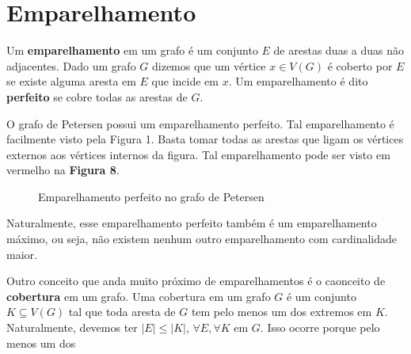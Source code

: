 \documentclass[11pt,a4paper]{exam}
\begin{document}
\section{Emparelhamento}
Um \textbf{emparelhamento} em um grafo é um conjunto $E$ de arestas duas a
duas não adjacentes. Dado um grafo $G$ dizemos que um vértice $x\in
V(G)$ é coberto por $E$ se existe alguma aresta em $E$ que incide em
$x$. Um emparelhamento é dito \textbf{perfeito} se cobre todas as
arestas de $G$. \par
O grafo de Petersen possui um emparelhamento perfeito. Tal
emparelhamento é facilmente visto pela Figura 1. Basta tomar todas as
arestas que ligam os vértices externos aos vértices internos da figura.
Tal emparelhamento pode ser visto em vermelho na \textbf{Figura 8}.
\begin{figure}[H]
    \centering
    \caption{Emparelhamento perfeito no grafo de Petersen}
\end{figure}
Naturalmente, esse emparelhamento perfeito também é um emparelhamento
máximo, ou seja, não existem nenhum outro emparelhamento com
cardinalidade maior.\par
Outro conceito que anda muito próximo de emparelhamentos é o caonceito
de \textbf{cobertura} em um grafo. Uma cobertura em um grafo $G$ é um
conjunto $K \subseteq V(G)$  tal que toda aresta de $G$ tem pelo menos
um dos extremos em $K$. Naturalmente, devemos ter $|E| \leq |K|$,
$\forall E, \forall K$ em $G$. Isso ocorre porque pelo menos um dos
\end{document}
